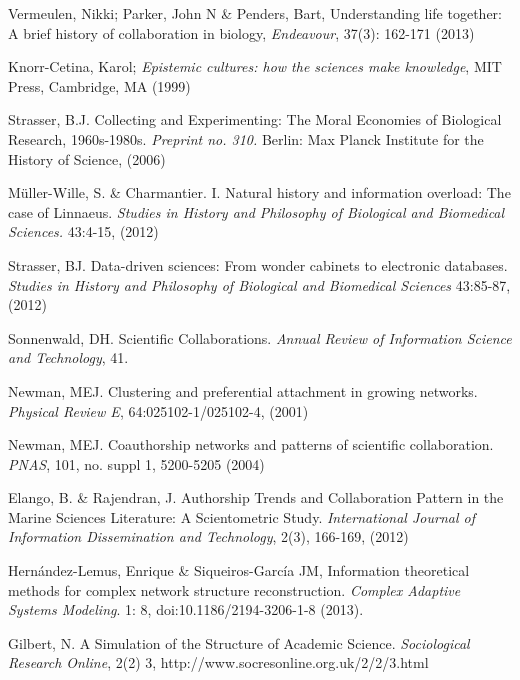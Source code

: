 \documentclass[11pt]{article}
\begin{document}
\begin{thebibliography}{100}

 Vermeulen, Nikki; Parker, John N \& Penders,
  Bart, Understanding life together: A brief history of collaboration
  in biology, \textit{Endeavour}, 37(3): 162-171 (2013) 

 Knorr-Cetina, Karol; \textit{Epistemic
  cultures: how the sciences make knowledge}, MIT Press, Cambridge, MA
  (1999) 

 Strasser, B.J. Collecting and Experimenting:
  The Moral Economies of Biological Research, 1960s-1980s.
  \textit{Preprint no. 310.} Berlin: Max Planck Institute for the
  History of Science, (2006) 

 M\"{u}ller-Wille, S. \& Charmantier. I.  Natural
  history and information overload: The case of Linnaeus.
  \textit{Studies in History and Philosophy of Biological and
    Biomedical Sciences.} 43:4-15, (2012) 

 Strasser, BJ. Data-driven sciences: From
  wonder cabinets to electronic databases. \textit{Studies in History
    and Philosophy of Biological and Biomedical Sciences} 43:85-87,
  (2012)

 Sonnenwald, DH. Scientific Collaborations. \textit{Annual Review of Information Science and
  Technology}, 41.

 Newman, MEJ. Clustering and preferential
  attachment in growing networks. \textit{Physical Review E},
  64:025102-1/025102-4, (2001) 

 Newman, MEJ. Coauthorship networks and patterns
  of scientific collaboration. \textit{PNAS}, 101, no. suppl 1,
  5200-5205 (2004) 

 Elango, B. \& Rajendran, J. Authorship Trends and
  Collaboration Pattern in the Marine Sciences Literature: A
  Scientometric Study. \textit{International Journal of Information
    Dissemination and Technology}, 2(3), 166-169, (2012)
  
  
 Hern\'andez-Lemus, Enrique \&
  Siqueiros-Garc\'ia JM, Information theoretical methods for complex
  network structure reconstruction. \textit{Complex Adaptive Systems
    Modeling}. 1: 8, doi:10.1186/2194-3206-1-8 (2013).

 Gilbert, N. A Simulation of the Structure of
  Academic Science. \textit{Sociological Research Online}, 2(2) 3,
  http://www.socresonline.org.uk/2/2/3.html 
  

\end{thebibliography}
\end{document}
